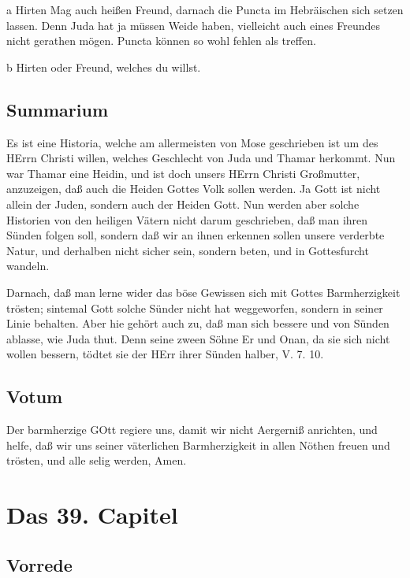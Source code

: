 a Hirten Mag auch heißen Freund, darnach die Puncta im Hebräischen sich setzen lassen. Denn Juda hat ja müssen Weide haben, vielleicht auch eines Freundes nicht gerathen mögen. Puncta können so wohl fehlen als treffen.

b Hirten oder Freund, welches du willst.


\section{Summarium}

Es ist eine Historia, welche am allermeisten von Mose geschrieben ist um des HErrn Christi willen, welches Geschlecht von Juda und Thamar herkommt. Nun war Thamar eine Heidin, und ist doch unsers HErrn Christi Großmutter, anzuzeigen, daß auch die Heiden Gottes Volk sollen werden. Ja Gott ist nicht allein der Juden, sondern auch der Heiden Gott. Nun werden aber solche Historien von den heiligen Vätern nicht darum geschrieben, daß man ihren Sünden folgen soll, sondern daß wir an ihnen erkennen sollen unsere verderbte Natur, und derhalben nicht sicher sein, sondern beten, und in Gottesfurcht wandeln.

Darnach, daß man lerne wider das böse Gewissen sich mit Gottes Barmherzigkeit trösten; sintemal Gott solche Sünder nicht hat weggeworfen, sondern in seiner Linie behalten. Aber hie gehört auch zu, daß man sich bessere und von Sünden ablasse, wie Juda thut. Denn seine zween Söhne Er und Onan, da sie sich nicht wollen bessern, tödtet sie der HErr ihrer Sünden halber, V. 7. 10.

\section{Votum}

Der barmherzige GOtt regiere uns, damit wir nicht Aergerniß anrichten, und helfe, daß wir uns seiner väterlichen Barmherzigkeit in allen Nöthen freuen und trösten, und alle selig werden, Amen.

\chapter{Das 39. Capitel}

\section{Vorrede}

